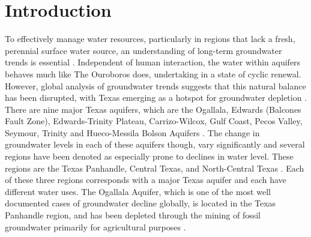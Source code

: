 \section*{Introduction}
To effectively manage water resources, particularly in regions that lack a fresh, perennial surface water source, an understanding of long-term groundwater trends is essential \cite{jasechko2024rapid, gyawali2022quantifying, konikow2005groundwater, oki2006global}. Independent of human interaction, the water within aquifers behaves much like The Ouroboros does, undertaking in a state of cyclic renewal. However, global analysis of groundwater trends suggests that this natural balance has been disrupted, with Texas emerging as a hotspot for groundwater depletion \cite{scanlon2023global, oki2006global, vorosmarty2000global}. There are nine major Texas aquifers, which are the Ogallala, Edwards (Balcones Fault Zone), Edwards-Trinity Plateau, Carrizo-Wilcox, Gulf Coast, Pecos Valley, Seymour, Trinity and Hueco-Messila Bolson Aquifers \cite{twdb_major}. The change in groundwater levels in each of these aquifers though, vary significantly and several regions have been denoted as especially prone to declines in water level. These regions are the Texas Panhandle, Central Texas, and North-Central Texas \cite{chaudhuri2014long}. Each of these three regions corresponds with a major Texas aquifer and each have different water uses. The Ogallala Aquifer, which is one of the most well documented cases of groundwater decline globally, is located in the Texas Panhandle region, and has been depleted through the mining of fossil groundwater primarily for agricultural purposes \cite{scanlon2012overview, tewari2016management, konikow2005groundwater}.
